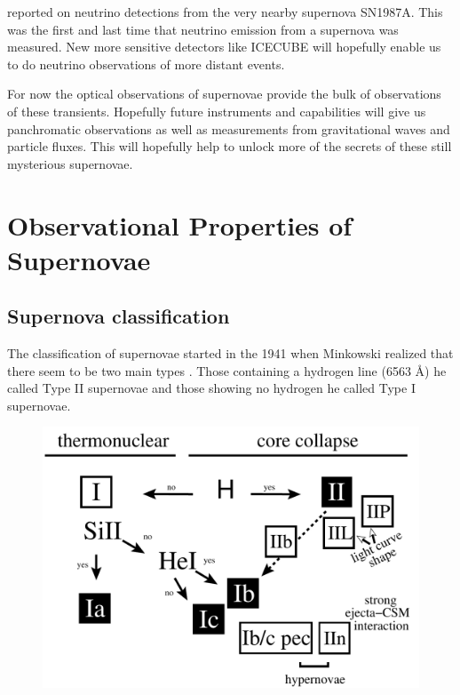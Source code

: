 \citet{1987PhRvL..58.1494B,1987PhRvL..58.1490H,Alekseev:1988gp} reported on neutrino detections from the very nearby supernova SN1987A. This was the first and last time that neutrino emission from a supernova was measured. New more sensitive detectors like ICECUBE \citep{2008ICRC....4..835K} will hopefully enable us to do neutrino observations of more distant events.

For now the optical observations of supernovae provide the bulk of observations of these transients. Hopefully future instruments and capabilities will give us panchromatic observations as well as measurements from gravitational waves and particle fluxes. 
This will hopefully help to unlock more of the secrets of these still mysterious supernovae.

\section{Observational Properties of Supernovae}

\subsection{Supernova classification}
\label{sec:sn_classification}

The classification of supernovae started in the 1941 when Minkowski realized that there seem to be two main types \citep{1941PASP...53..224M}. Those containing a hydrogen line (6563 \AA) he called Type II supernovae and those showing no hydrogen he called Type I supernovae.  

\begin{figure}[htb] %
   \centering
   \includegraphics[width=.7\textwidth]{chapter_intro/plots/sn_classification.pdf} 
   \caption{}
   \label{fig:sn_classification}
\end{figure}

